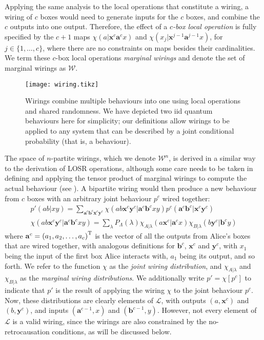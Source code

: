 \documentclass[10pt, a4paper]{article}
\numberwithin{equation}{section} %
\theoremstyle{definition}
\theoremstyle{plain}
\newcommand{\dintv}[2]{\mathopen\{#1,\ldots,#2\mathclose\}}
\newcommand{\?}{\mathrel{?}} %
\newcommand{\cvec}[1]{\boldsymbol{\mathbf{#1}}}    %
\newcommand{\sW}{\mathcal{W}}
\newcommand{\Ls}{\mathcal{L}}
\begin{document}
              Applying the same analysis to the local operations that constitute a wiring, a wiring of \(c\) boxes would need to generate inputs for the \(c\) boxes, and combine the \(c\) outputs into one output. Therefore, the effect of a \emph{\(c\)-box local operation} is fully specified by the \(c+1\) maps \(\chi(a|\cvec{x}^c\cvec{a}^{c}x)\) and \(\chi(x_j|\cvec{x}^{j-1}\cvec{a}^{j-1}x)\), for \(j \in \dintv{1}{c}\), where there are no constraints on maps besides their cardinalities. We term these \(c\)-box local operations \emph{marginal wirings} and denote the set of marginal wirings as \(\sW\).

              \begin{figure}
                \centering
                \texttt{[image: wiring.tikz]}
                \caption[Causal influences in a wiring between two iid quantum behaviours.]{\label{fig:wiring} Wirings combine multiple behaviours into one using local operations and shared randomness. We have depicted two iid quantum behaviours here for simplicity; our definitions allow wirings to be applied to any system that can be described by a joint conditional probability (that is, a behaviour).}
            \end{figure}

              The space of \(n\)-partite wirings, which we denote \(\sW^n\), is derived in a similar way to the derivation of LOSR operations, although some care needs to be taken in defining and applying the tensor product of marginal wirings to compute the actual behaviour (see ). A bipartite wiring would then produce a new behaviour from \(c\) boxes with an arbitrary joint behaviour \(p^c\) wired together:
              \begin{gather}
                p'(ab|xy) = \sum_{\cvec{a}^c\cvec{b}^c\cvec{x}^c\cvec{y}^c} \chi(ab\cvec{x}^c\cvec{y}^c|\cvec{a}^c\cvec{b}^cxy) p^c(\cvec{a}^c\cvec{b}^c|\cvec{x}^c\cvec{y}^c)\label{eqn:jwirdistdef} \\
                \chi(ab\cvec{x}^c\cvec{y}^c|\cvec{a}^c\cvec{b}^cxy) = \sum_{\lambda} P_{\Lambda}(\lambda) \chi_{A|\lambda}(a\cvec{x}^c|\cvec{a}^cx) \chi_{B|\lambda}(b\cvec{y}^c|\cvec{b}^cy) \label{eqn:mwirdistdef}
              \end{gather}
              where \(\cvec{a}^c = {(a_1, a_2, \ldots, a_c)}^{\rm T}\) is the vector of all the outputs from Alice's boxes that are wired together, with analogous definitions for \(\cvec{b}^c\), \(\cvec{x}^c\) and \(\cvec{y}^c\), with \(x_1\) being the input of the first box Alice interacts with, \(a_1\) being its output, and so forth. We refer to the function \(\chi\) as the \emph{joint wiring distribution}, and \(\chi_{A|\lambda}\) and \(\chi_{B|\lambda}\) as the \emph{marginal wiring distributions}. We additionally write \(p' = \chi[p^c]\) to indicate that \(p'\) is the result of applying the wiring \(\chi\) to the joint behaviour \(p^c\). Now, these distributions are clearly elements of \(\Ls\), with outputs \((a, \cvec{x}^c)\) and \((b, \cvec{y}^c)\), and inputs \((\cvec{a}^{c-1}, x)\) and \((\cvec{b}^{c-1}, y)\). However, not every element of \(\Ls\) is a valid wiring, since the wirings are also constrained by the no-retrocausation conditions, as will be discussed below.
\end{document}
